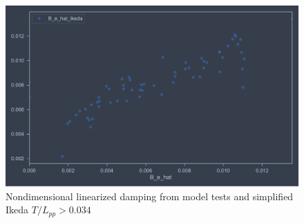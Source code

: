 \begin{figure}[H]
    \centering
    \includegraphics[width=\columnwidth]{figures/B_e_hat_good.pdf}
    \caption{Nondimensional linearized damping from model tests and simplified Ikeda $T/L_{pp}>0.034$}
    \label{fig:B_e_hat_good}
\end{figure}





